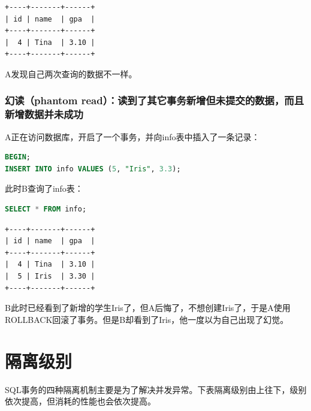 \documentclass[12pt, openany, oneside]{book}
\begin{document}
\begin{tcolorbox}
    \begin{verbatim}
+----+-------+------+
| id | name  | gpa  |
+----+-------+------+
|  4 | Tina  | 3.10 |
+----+-------+------+
	\end{verbatim}
\end{tcolorbox}

A发现自己两次查询的数据不一样。

\subsubsection{幻读（phantom read）：读到了其它事务新增但未提交的数据，而且新增数据并未成功}

A正在访问数据库，开启了一个事务，并向info表中插入了一条记录：

\vspace{-0.5cm}

\begin{lstlisting}[language=SQL]
BEGIN;
INSERT INTO info VALUES (5, "Iris", 3.3);
\end{lstlisting}

此时B查询了info表：

\vspace{-0.5cm}

\begin{lstlisting}[language=SQL]
SELECT * FROM info;
\end{lstlisting}

\begin{tcolorbox}
    \begin{verbatim}
+----+-------+------+
| id | name  | gpa  |
+----+-------+------+
|  4 | Tina  | 3.10 |
|  5 | Iris  | 3.30 |
+----+-------+------+
	\end{verbatim}
\end{tcolorbox}

B此时已经看到了新增的学生Iris了，但A后悔了，不想创建Iris了，于是A使用ROLLBACK回滚了事务。但是B却看到了Iris，他一度以为自己出现了幻觉。

\section{隔离级别}

SQL事务的四种隔离机制主要是为了解决并发异常。下表隔离级别由上往下，级别依次提高，但消耗的性能也会依次提高。
\end{document}
